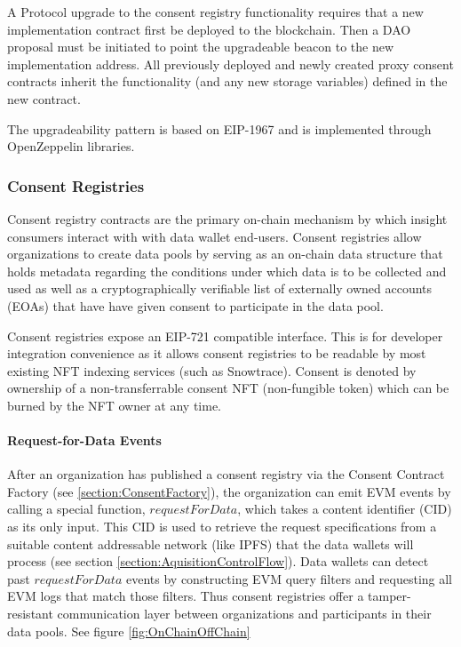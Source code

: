 A Protocol upgrade to the consent registry functionality requires that a new implementation contract first be deployed to the blockchain. Then a 
DAO proposal must be initiated to point the upgradeable beacon to the new implementation address. All previously deployed and newly created proxy 
consent contracts inherit the functionality (and any new storage variables) defined in the new contract.

The upgradeability pattern is based on EIP-1967 and is implemented through OpenZeppelin libraries.

\subsubsection{Consent Registries}
\label{section:ConsentContract}


Consent registry contracts are the primary on-chain mechanism by which insight consumers interact with with data wallet end-users. Consent 
registries allow organizations to create data pools by serving as an on-chain data structure that holds metadata regarding the conditions 
under which data is to be collected and used as well as a cryptographically verifiable list of externally owned accounts (EOAs) that have
have given consent to participate in the data pool. 

Consent registries expose an EIP-721 compatible interface. This is for developer integration convenience as it allows consent registries to 
be readable by most existing NFT indexing services (such as Snowtrace). Consent is denoted by ownership of a non-transferrable consent NFT 
(non-fungible token) which can be burned by the NFT owner at any time. 

\paragraph{Request-for-Data Events}
\label{section:RequestForData}

After an organization has published a consent registry via the Consent Contract Factory (see \ref{section:ConsentFactory}), the organization can emit
EVM events by calling a special function, $requestForData$, which takes a content identifier (CID) as its only input. This CID is used to 
retrieve the request specifications from a suitable content addressable network (like IPFS) that the data wallets will process (see section \ref{section:AquisitionControlFlow}). Data wallets can detect 
past $requestForData$ events by constructing EVM query filters and requesting all EVM logs that match those filters. Thus consent registries offer a 
tamper-resistant communication layer between organizations and participants in their data pools. See figure \ref{fig:OnChainOffChain}

